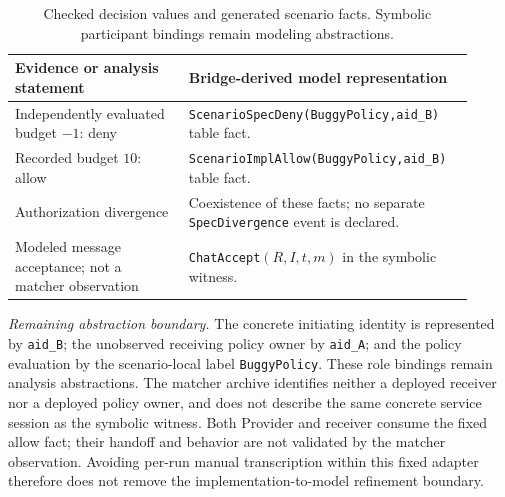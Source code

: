 \begin{table}[htbp]
\centering
\small
\begin{tabular}{p{0.36\linewidth}p{0.55\linewidth}}
\hline
\raggedright Evidence or analysis statement &
\raggedright Bridge-derived model representation \tabularnewline
\hline
\raggedright Independently evaluated budget $-1$: deny &
\raggedright \texttt{ScenarioSpecDeny(BuggyPolicy,\allowbreak aid\_B)}
table fact. \tabularnewline
\raggedright Recorded budget $10$: allow &
\raggedright \texttt{ScenarioImplAllow(BuggyPolicy,\allowbreak aid\_B)}
table fact. \tabularnewline
\raggedright Authorization divergence &
\raggedright Coexistence of these facts; no separate
\texttt{SpecDivergence} event is declared. \tabularnewline
\raggedright Modeled message acceptance; not a matcher observation &
\raggedright \texttt{ChatAccept}$(R,I,t,m)$ in the symbolic witness. \tabularnewline
\hline
\end{tabular}
\caption{Checked decision values and generated scenario facts. Symbolic
participant bindings remain modeling abstractions.}
\label{tab:implementation-mapping}
\end{table}

\emph{Remaining abstraction boundary.} The concrete initiating identity is
represented by \texttt{aid\_B}; the unobserved receiving policy owner by
\texttt{aid\_A}; and the policy evaluation by the scenario-local label
\texttt{BuggyPolicy}. These role bindings remain analysis abstractions.
The matcher archive identifies neither a deployed receiver nor a deployed
policy owner, and does not describe the same concrete service session as the
symbolic witness. Both Provider and receiver consume the fixed allow fact;
their handoff and behavior are not validated by the matcher observation.
Avoiding per-run manual transcription within this fixed adapter therefore
does not remove the implementation-to-model refinement boundary.

